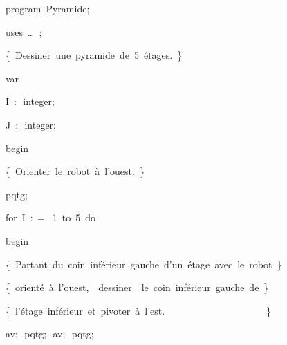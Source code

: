 
{
\parindent {}
\medskip

\carrenoir
\vspace{\neglskip}\mbox{\blc  \idt  \mcl program\idt \label{prog:Pyramide}\ Pyramide$;$
}\par 
\vspace{\neglskip}\mbox{\blc \blk\idt \mcl uses\idt \ \ldots\ $;$
}\par 
\vspace{\neglskip}\mbox{\blc  \blk\idt  \cmt  \{\ Dessiner\ une\ pyramide\ de\ 5\ étages.\ \}\idt }\par 
\pagebreak[3] 
\vspace{\neglskip}\mbox{\blc  \idt  \mcl var\idt }\par 
\vspace{\neglskip}\mbox{\blc  \blk\idt  I\ $:$\ integer$;$\ }\par 
\vspace{\neglskip}\mbox{\blc  \blk\idt  J\ $:$\ integer$;$\ }\par 
\vspace{\neglskip}\mbox{\blc  \idt  \mcl begin\idt }\par 
\vspace{\neglskip}\mbox{\blc  \blk\idt  \cmt  \{\ Orienter\ le\ robot\ à\ l{'}ouest.\ \}\idt }\par 
\vspace{\neglskip}\mbox{\blc  \blk\idt  pqtg$;$\ }\par 
\pagebreak[3] 
\vspace{\neglskip}\mbox{\blc  \blk\idt  \mcl for\idt \ I\ $:$$=$\ 1\ \mcl to\idt \ 5\ \mcl do\idt }\par 
\vspace{\neglskip}\mbox{\blc  \blk\blk\idt  \mcl begin\idt }\par 
\vspace{\neglskip}\mbox{\blc  \blk\blk\blk\idt  \cmt  \{\ Partant\ du\ coin\ inférieur\ gauche\ d{'}un\ étage\ avec\ le\ robot\ \}\idt }\par 
\vspace{\neglskip}\mbox{\blc  \blk\blk\blk\idt  \cmt  \{\ orienté\ à\ l{'}ouest,\ \ dessiner\ \ le\ coin\ inférieur\ gauche\ de\ \}\idt }\par 
\vspace{\neglskip}\mbox{\blc  \blk\blk\blk\idt  \cmt  \{\ l{'}étage\ inférieur\ et\ pivoter\ à\ l{'}est.\ \ \ \ \ \ \ \ \ \ \ \ \ \ \ \ \ \ \ \ \ \}\idt }\par 
\vspace{\neglskip}\mbox{\blc  \blk\blk\blk\blk\blk\idt  av$;$\ pqtg$;$\ av$;$\ pqtg$;$}\par 
}
